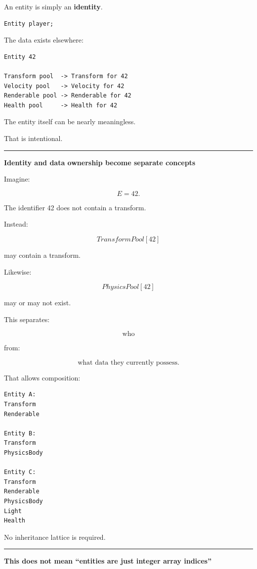 An entity is simply an \textbf{identity}.

\begin{verbatim}
Entity player;
\end{verbatim}

The data exists elsewhere:

\begin{verbatim}
Entity 42

Transform pool  -> Transform for 42
Velocity pool   -> Velocity for 42
Renderable pool -> Renderable for 42
Health pool     -> Health for 42
\end{verbatim}

The entity itself can be nearly meaningless.

That is intentional.

\begin{center}\rule{0.5\linewidth}{0.5pt}\end{center}

\textbf{Identity and data ownership become separate concepts}

Imagine:

\[
E=42.
\]

The identifier 42 does not contain a transform.

Instead:

\[
TransformPool[42]
\]

may contain a transform.

Likewise:

\[
PhysicsPool[42]
\]

may or may not exist.

This separates:

\[
\boxed{\text{who}}
\]

from:

\[
\boxed{\text{what data they currently possess}}.
\]

That allows composition:

\begin{verbatim}
Entity A:
Transform
Renderable

Entity B:
Transform
PhysicsBody

Entity C:
Transform
Renderable
PhysicsBody
Light
Health
\end{verbatim}

No inheritance lattice is required.

\begin{center}\rule{0.5\linewidth}{0.5pt}\end{center}

\textbf{This does not mean ``entities are just integer array indices''}

